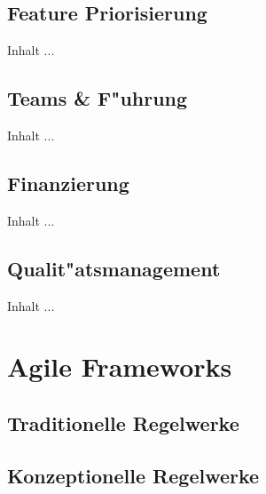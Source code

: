 \subsection{Feature Priorisierung}
Inhalt ...

\subsection{Teams \& F"uhrung}
Inhalt ...

\subsection{Finanzierung}
Inhalt ...

\subsection{Qualit"atsmanagement}
Inhalt ...


\section{Agile Frameworks}

\subsection{Traditionelle Regelwerke}

\subsection{Konzeptionelle Regelwerke}


